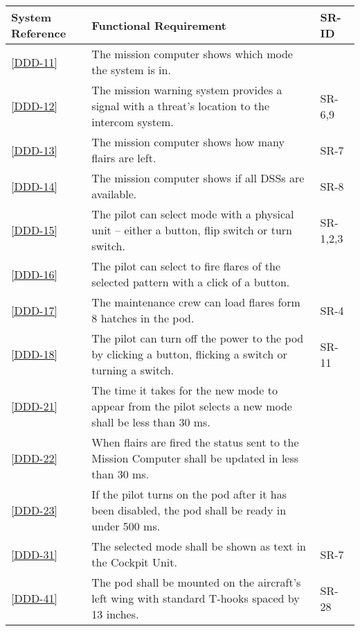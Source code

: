 \documentclass[Main]{subfiles}
\begin{document}
\begin{longtable}{l p{10.4cm} p{1.8cm} } \hline
System Reference & Functional Requirement & SR-ID\\\hline
\ref{DDD-11} & The mission computer shows which mode the system is in. &  \\

\ref{DDD-12} & The mission warning system provides a signal with a threat's location to the intercom system. & SR-6,9 \\

\ref{DDD-13} & The mission computer shows how many flairs are left. & SR-7\\

\ref{DDD-14} & The mission computer shows if all DSSs are available. & SR-8\\

\ref{DDD-15} & The pilot can select mode with a physical unit -- either a button, flip switch or turn switch. & SR-1,2,3\\

\ref{DDD-16} & The pilot can select to fire flares of the selected pattern with a click of a button. & \\

\ref{DDD-17} & The maintenance crew can load flares form 8 hatches in the pod. & SR-4\\

\ref{DDD-18} & The pilot can turn off the power to the pod by clicking a button, flicking a switch or turning a switch. & SR-11\\

\ref{DDD-21} & The time it takes for the new mode to appear from the pilot selects a new mode shall be less than 30 ms. & \\

\ref{DDD-22} & When flairs are fired the status sent to the Mission Computer shall be updated in less than 30 ms.& \\

\ref{DDD-23} & If the pilot turns on the pod after it has been disabled, the pod shall be ready in under 500 ms.& \\

\ref{DDD-31} & The selected mode shall be shown as text in the Cockpit Unit. & SR-7\\

\ref{DDD-41} &  The pod shall be mounted on the aircraft's left wing with standard T-hooks spaced by 13 inches. & SR-28 \\


\end{longtable}
\end{document}
